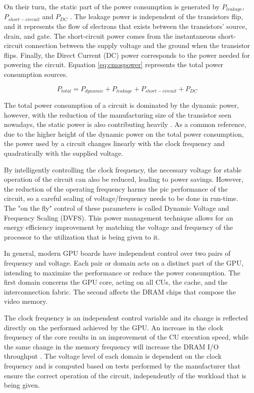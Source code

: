 On their turn, the static part of the power consumption is generated by $P_{leakage}$, $P_{short-circuit}$ and $P_{DC}$ \cite{mei_survey_2016}. The leakage power is independent of the transistors flip, and it represents the flow of electrons that exists between the transistors' source, drain, and gate. The short-circuit power comes from the instantaneous short-circuit connection between the supply voltage and the ground when the transistor flips. Finally, the Direct Current (DC) power corresponds to the power needed for powering the circuit. Equation \ref{eq:cmospower} represents the total power consumption sources.

\begin{equation}
    P_{total} = P_{dynamic} + P_{leakage} + P_{short-circuit} + P_{DC}
    \label{eq:cmospower}
\end{equation}

The total power consumption of a circuit is dominated by the dynamic power, however, with the reduction of the manufacturing size of the transistor seen nowadays, the static power is also contributing heavily \cite{s._hong_modeling_2012} \cite{hong_integrated_2010}. As a common reference, due to the higher height of the dynamic power on the total power consumption, the power used by a circuit changes linearly with the clock frequency and quadratically with the supplied voltage.


By intelligently controlling the clock frequency, the necessary voltage for stable operation of the circuit can also be reduced, leading to power savings. However, the reduction of the operating frequency harms the pic performance of the circuit, so a careful scaling of voltage/frequency needs to be done in run-time. The "on the fly" control of these parameters is called Dynamic Voltage and Frequency Scaling (DVFS). This power management technique allows for an energy efficiency improvement by matching the voltage and frequency of the processor to the utilization that is being given to it.



In general, modern GPU boards have independent control over two pairs of frequency and voltage. Each pair or domain acts on a distinct part of the GPU, intending to maximize the performance or reduce the power consumption. The first domain concerns the GPU core, acting on all CUs, the cache, and the interconnection fabric. The second affects the DRAM chips that compose the video memory. 

The clock frequency is an independent control variable and its change is reflected directly on the performed achieved by the GPU. An increase in the clock frequency of the core results in an improvement of the CU execution speed, while the same change in the memory frequency will increase the DRAM I/O throughput \cite{mei_survey_2016}. The voltage level of each domain is dependent on the clock frequency and is computed based on tests performed by the manufacturer that ensure the correct operation of the circuit, independently of the workload that is being given.

